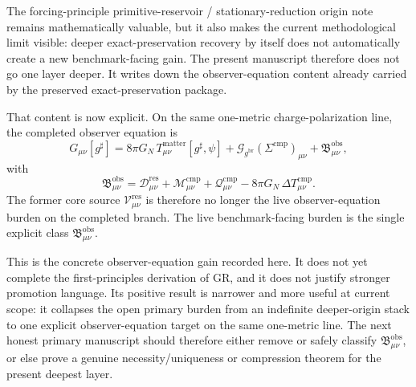 \documentclass[11pt]{article}
\newcommand{\ObserverMetric}{g^{\mathrm{br}}}
\newcommand{\CompletedMetric}{g^{\sharp}}
\newcommand{\CompShift}{\Sigma^{\mathrm{cmp}}}
\newcommand{\ResidualCore}{\mathcal V_{\mu\nu}^{\mathrm{res}}}
\newcommand{\ResidualDec}{\mathcal D_{\mu\nu}^{\mathrm{res}}}
\newcommand{\GaugeBook}{\mathcal G_{\ObserverMetric}}
\newcommand{\CompMix}{\mathcal M_{\mu\nu}^{\mathrm{cmp}}}
\newcommand{\CompQuad}{\mathcal Q_{\mu\nu}^{\mathrm{cmp}}}
\newcommand{\DeltaTComp}{\Delta T_{\mu\nu}^{\mathrm{cmp}}}
\newcommand{\ObsBurden}{\mathfrak B_{\mu\nu}^{\mathrm{obs}}}
\begin{document}
The forcing-principle primitive-reservoir / stationary-reduction origin note remains mathematically valuable, but it also makes the current methodological limit visible: deeper exact-preservation recovery by itself does not automatically create a new benchmark-facing gain. The present manuscript therefore does not go one layer deeper. It writes down the observer-equation content already carried by the preserved exact-preservation package.

That content is now explicit. On the same one-metric charge-polarization line, the completed observer equation is
\[
G_{\mu\nu}[\CompletedMetric]
=
8\pi G_N\,T_{\mu\nu}^{\mathrm{matter}}[\CompletedMetric,\psi]
+\GaugeBook(\CompShift)_{\mu\nu}
+\ObsBurden,
\]
with
\[
\ObsBurden
=
\ResidualDec+\CompMix+\CompQuad-8\pi G_N\,\DeltaTComp.
\]
The former core source \(\ResidualCore\) is therefore no longer the live observer-equation burden on the completed branch. The live benchmark-facing burden is the single explicit class \(\ObsBurden\).

This is the concrete observer-equation gain recorded here. It does not yet complete the first-principles derivation of GR, and it does not justify stronger promotion language. Its positive result is narrower and more useful at current scope: it collapses the open primary burden from an indefinite deeper-origin stack to one explicit observer-equation target on the same one-metric line. The next honest primary manuscript should therefore either remove or safely classify \(\ObsBurden\), or else prove a genuine necessity/uniqueness or compression theorem for the present deepest layer.
\end{document}
